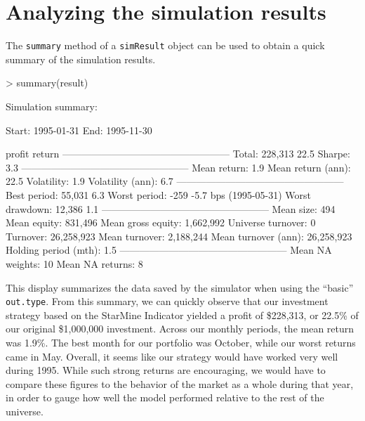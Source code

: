 \documentclass{article}
\begin{document}
\section{Analyzing the simulation results}

The \texttt{summary} method of a \texttt{simResult} object can be used
to obtain a quick summary of the simulation results.

\begin{Schunk}
\begin{Sinput}
> summary(result)
\end{Sinput}
\begin{Soutput}
Simulation summary:


Start:   1995-01-31
End:     1995-11-30

                                    profit   return
---------------------------------------------------
Total:                             228,313     22.5 %  
Sharpe:                                         3.3
---------------------------------------------------
Mean return:                                    1.9 %  
Mean return (ann):                             22.5 %  
Volatility:                                     1.9 %  
Volatility (ann):                               6.7 %  
---------------------------------------------------
Best period:                        55,031      6.3 %   (1995-10-31)
Worst period:                         -259     -5.7 bps (1995-05-31)
Worst drawdown:                     12,386      1.1 %   (1995-04-30 to 1995-05-31)
---------------------------------------------------
Mean size:                             494
Mean equity:                       831,496
Mean gross equity:               1,662,992
Universe turnover:                       0
Turnover:                       26,258,923
Mean turnover:                   2,188,244
Mean turnover (ann):            26,258,923
Holding period (mth):                  1.5
---------------------------------------------------
Mean NA weights:                        10
Mean NA returns:                         8
\end{Soutput}
\end{Schunk}

This display summarizes the data saved by the simulator when using the
``basic'' \texttt{out.type}.  From this summary, we can quickly
observe that our investment strategy based on the StarMine Indicator
yielded a profit of \$228,313, or 22.5\% of our original \$1,000,000
investment.  Across our monthly periods, the mean return was 1.9\%.
The best month for our portfolio was October, while our worst returns
came in May.  Overall, it seems like our strategy would have worked
very well during 1995.  While such strong returns are encouraging, we
would have to compare these figures to the behavior of the market as a
whole during that year, in order to gauge how well the model performed
relative to the rest of the universe.
\end{document}
